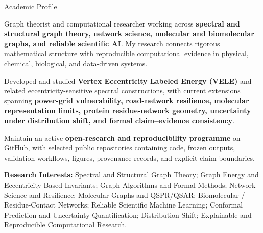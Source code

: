 \begin{rubric}{Academic Profile}

\entry*[]%
Graph theorist and computational researcher working across \textbf{spectral and structural graph theory, network science, molecular and biomolecular graphs, and reliable scientific AI}. My research connects rigorous mathematical structure with reproducible computational evidence in physical, chemical, biological, and data-driven systems.

\entry*[]%
Developed and studied \textbf{Vertex Eccentricity Labeled Energy (VELE)} and related eccentricity-sensitive spectral constructions, with current extensions spanning \textbf{power-grid vulnerability, road-network resilience, molecular representation limits, protein residue-network geometry, uncertainty under distribution shift, and formal claim--evidence consistency}.

\entry*[]%
Maintain an active \textbf{open-research and reproducibility programme} on GitHub, with selected public repositories containing code, frozen outputs, validation workflows, figures, provenance records, and explicit claim boundaries.

\entry*[]%
\textbf{Research Interests:}
Spectral and Structural Graph Theory; Graph Energy and Eccentricity-Based Invariants; Graph Algorithms and Formal Methods; Network Science and Resilience; Molecular Graphs and QSPR/QSAR; Biomolecular / Residue-Contact Networks; Reliable Scientific Machine Learning; Conformal Prediction and Uncertainty Quantification; Distribution Shift; Explainable and Reproducible Computational Research.

\end{rubric}
